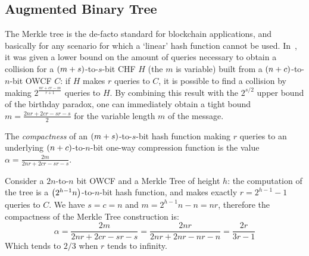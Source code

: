 \subsection{Augmented Binary Tree}
The Merkle tree is the de-facto standard for blockchain applications, and basically for any 
scenario for which a `linear' hash function cannot be used.
In~\cite{Stam2008}, it was given a lower bound on the amount of queries necessary to obtain a 
collision for a \(\Parens*{m+s}\)-to-\(s\)-bit CHF \(H\) (the \(m\) is variable) built from a 
\(\Parens*{n+c}\)-to-\(n\)-bit OWCF \(C\): if \(H\) makes \(r\) queries to \(C\), it is possible 
to find a collision by making \(2^{\frac{nr + cr - m}{r + 1}}\) queries to \(H\).
By combining this result with the \(2^{s/2}\) upper bound of the birthday paradox, one can 
immediately obtain a tight bound \(m = \frac{2nr + 2cr -sr - s}{2}\) for the variable length \(m\) 
of the message.

\begin{definition}
	The \emph{compactness} of an \(\Parens*{m+s}\)-to-\(s\)-bit hash function making \(r\) queries to 
	an underlying \(\Parens*{n+c}\)-to-\(n\)-bit one-way compression function is the value
	\(\alpha = \frac{2m}{2nr + 2cr -sr - s}\).
\end{definition}

\begin{example}\label{ex:mtree_compactness}
	Consider a \(2n\)-to-\(n\) bit OWCF and a Merkle Tree of height \(h\): the computation 
	of the tree is a \(\Parens*{2^{h-1}n}\)-to-\(n\)-bit hash function, and makes exactly 
	\(r = 2^{h-1} - 1\) queries to \(C\).
	We have \(s = c = n\) and \(m = 2^{h-1}n - n = nr\), therefore the compactness of the Merkle 
	Tree construction is:
	\[
		\alpha = \frac{2m}{2nr + 2cr -sr - s} = 
		\frac{2nr}{2nr + 2nr - nr - n} =
		\frac{2r}{3r - 1}
	\]
	Which tends to \(2/3\) when \(r\) tends to infinity.
\end{example}

